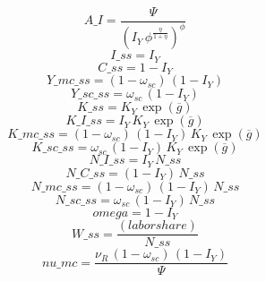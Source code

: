 \begin{dmath*}
A\_I = \frac{{{\Psi}}}{\left({{I_Y}}\, {{\phi}}^{\frac{{{\eta}}}{1+{{\eta}}}}\right)^{{{\phi}}}}
\end{dmath*}
\begin{dmath*}
I\_ss = {{I_Y}}
\end{dmath*}
\begin{dmath*}
C\_ss = 1-{{I_Y}}
\end{dmath*}
\begin{dmath*}
Y\_mc\_ss = \left(1-{\omega_{sc}}\right)\, \left(1-{{I_Y}}\right)
\end{dmath*}
\begin{dmath*}
Y\_sc\_ss = {\omega_{sc}}\, \left(1-{{I_Y}}\right)
\end{dmath*}
\begin{dmath*}
K\_ss = {{K_Y}}\, \exp\left({{\overline{g}}}\right)
\end{dmath*}
\begin{dmath*}
K\_I\_ss = {{I_Y}}\, {{K_Y}}\, \exp\left({{\overline{g}}}\right)
\end{dmath*}
\begin{dmath*}
K\_mc\_ss = \left(1-{\omega_{sc}}\right)\, \left(1-{{I_Y}}\right)\, {{K_Y}}\, \exp\left({{\overline{g}}}\right)
\end{dmath*}
\begin{dmath*}
K\_sc\_ss = {\omega_{sc}}\, \left(1-{{I_Y}}\right)\, {{K_Y}}\, \exp\left({{\overline{g}}}\right)
\end{dmath*}
\begin{dmath*}
N\_I\_ss = {{I_Y}}\, {N\_ss}
\end{dmath*}
\begin{dmath*}
N\_C\_ss = \left(1-{{I_Y}}\right)\, {N\_ss}
\end{dmath*}
\begin{dmath*}
N\_mc\_ss = \left(1-{\omega_{sc}}\right)\, \left(1-{{I_Y}}\right)\, {N\_ss}
\end{dmath*}
\begin{dmath*}
N\_sc\_ss = {\omega_{sc}}\, \left(1-{{I_Y}}\right)\, {N\_ss}
\end{dmath*}
\begin{dmath*}
omega = 1-{{I_Y}}
\end{dmath*}
\begin{dmath*}
W\_ss = \frac{{(labor share)}}{{N\_ss}}
\end{dmath*}
\begin{dmath*}
nu\_mc = \frac{{{\nu_R}}\, \left(1-{\omega_{sc}}\right)\, \left(1-{{I_Y}}\right)}{{{\Psi}}}
\end{dmath*}
